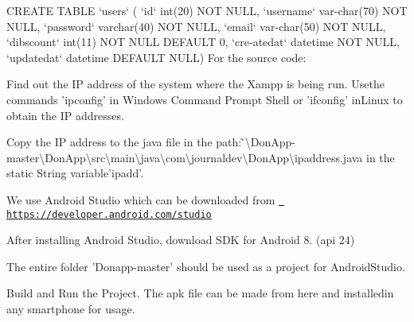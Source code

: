C\+R\+E\+A\+TE T\+A\+B\+LE ‘users‘ ( ‘id‘ int(20) N\+OT N\+U\+LL, ‘username‘ var-\/char(70) N\+OT N\+U\+LL, ‘password‘ varchar(40) N\+OT N\+U\+LL, ‘email‘ var-\/char(50) N\+OT N\+U\+LL, ‘dibscount‘ int(11) N\+OT N\+U\+LL D\+E\+F\+A\+U\+LT 0, ‘cre-\/atedat‘ datetime N\+OT N\+U\+LL, ‘updatedat‘ datetime D\+E\+F\+A\+U\+LT N\+U\+LL) For the source code\+:
\begin{DoxyEnumerate}
\item Find out the IP address of the system where the Xampp is being run. Usethe commands ’ipconfig’ in Windows Command Prompt Shell or ’ifconfig’ in\+Linux to obtain the IP addresses.
\item Copy the IP address to the java file in the path\+: ̃\textbackslash{}\+Don\+App-\/master\textbackslash{}\+Don\+App\textbackslash{}src\textbackslash{}main\textbackslash{}java\textbackslash{}com\textbackslash{}journaldev\textbackslash{}\+Don\+App\textbackslash{}ipaddress.\+java in the static String variable’ipadd’.
\item We use Android Studio which can be downloaded from \href{https://developer.android.com/studio}{\texttt{ https\+://developer.\+android.\+com/studio}}
\item After installing Android Studio, download S\+DK for Android 8. (api 24)
\item The entire folder ’\+Donapp-\/master’ should be used as a project for Android\+Studio.
\item Build and Run the Project. The apk file can be made from here and installedin any smartphone for usage. 
\end{DoxyEnumerate}